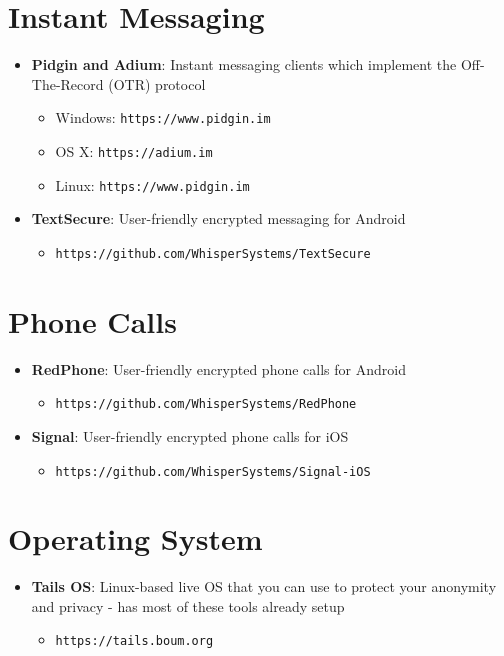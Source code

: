 \documentclass[8pt]{article}
\begin{document}
\section*{Instant Messaging}
\begin{itemize}
   \item \textbf{Pidgin and Adium}: Instant messaging clients which implement the Off-The-Record (OTR) protocol
       \begin{itemize}
         \item Windows: \texttt{https://www.pidgin.im}
         \item OS X: \texttt{https://adium.im}
         \item Linux: \texttt{https://www.pidgin.im}
       \end{itemize}
   \item \textbf{TextSecure}: User-friendly encrypted messaging for Android
       \begin{itemize}
         \item \texttt{https://github.com/WhisperSystems/TextSecure}
       \end{itemize}
\end{itemize}

\section*{Phone Calls}
\begin{itemize}
   \item \textbf{RedPhone}: User-friendly encrypted phone calls for Android
      \begin{itemize}
         \item \texttt{https://github.com/WhisperSystems/RedPhone}
      \end{itemize}
   \item \textbf{Signal}: User-friendly encrypted phone calls for iOS
      \begin{itemize}
         \item \texttt{https://github.com/WhisperSystems/Signal-iOS}
      \end{itemize}
\end{itemize}

\section*{Operating System}
\begin{itemize}
   \item \textbf{Tails OS}: Linux-based live OS that you can use to protect your anonymity and privacy - has most of these tools already setup
   \begin{itemize}
       \item \texttt{https://tails.boum.org}
   \end{itemize}
\end{itemize}
\end{document}
